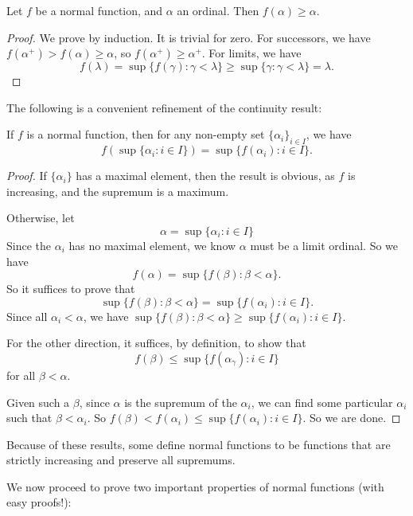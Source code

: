 \documentclass[a4paper]{article}
\begin{document}
\begin{own}
  \begin{lemma}
    Let $f$ be a normal function, and $\alpha$ an ordinal. Then $f(\alpha) \geq \alpha$.
  \end{lemma}

  \begin{proof}
    We prove by induction. It is trivial for zero. For successors, we have $f(\alpha^+) > f(\alpha) \geq \alpha$, so $f(\alpha^+) \geq \alpha^+$. For limits, we have
    \[
      f(\lambda) = \sup \{f(\gamma): \gamma < \lambda\} \geq \sup\{\gamma: \gamma < \lambda\} = \lambda.
    \]
  \end{proof}

  The following is a convenient refinement of the continuity result:
  \begin{lemma}
    If $f$ is a normal function, then for any non-empty set $\{\alpha_i\}_{i \in I}$, we have
    \[
      f(\sup\{\alpha_i: i \in I\}) = \sup\{f(\alpha_i): i \in I\}.
    \]
  \end{lemma}

  \begin{proof}
    If $\{\alpha_i\}$ has a maximal element, then the result is obvious, as $f$ is increasing, and the supremum is a maximum.

    Otherwise, let
    \[
      \alpha = \sup\{\alpha_i: i \in I\}
    \]
    Since the $\alpha_i$ has no maximal element, we know $\alpha$ must be a limit ordinal. So we have
    \[
      f(\alpha) = \sup \{f(\beta): \beta < \alpha\}.
    \]
    So it suffices to prove that
    \[
      \sup \{f(\beta): \beta < \alpha\} = \sup\{f(\alpha_i): i \in I\}.
    \]
    Since all $\alpha_i < \alpha$, we have $\sup \{f(\beta): \beta < \alpha\} \geq \sup\{f(\alpha_i): i \in I\}$.

    For the other direction, it suffices, by definition, to show that
    \[
      f(\beta) \leq \sup \{f(\alpha_\gamma): i \in I\}
    \]
    for all $\beta < \alpha$.

    Given such a $\beta$, since $\alpha$ is the supremum of the $\alpha_i$, we can find some particular $\alpha_i$ such that $\beta < \alpha_i$. So $f(\beta) < f(\alpha_i) \leq \sup \{f(\alpha_i): i \in I\}$. So we are done.
  \end{proof}
  Because of these results, some define normal functions to be functions that are strictly increasing and preserve all supremums.

  We now proceed to prove two important properties of normal functions (with easy proofs!):


\end{own}
\end{document}
